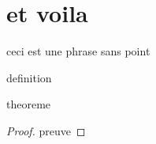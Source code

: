 %
\section{et voila}
ceci est une phrase sans point

\begin{definition}
    definition
\end{definition}

\begin{theorem}
    theoreme

\end{theorem}

\begin{proof}
    preuve
  
  
  \end{proof}